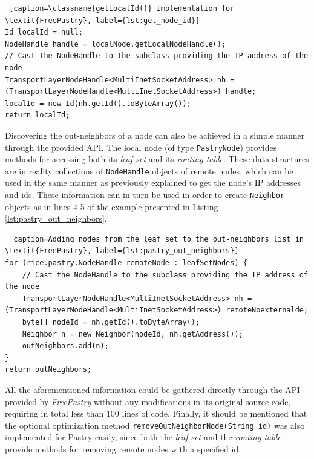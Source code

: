 \documentclass[a4paper,11pt,twoside]{report}
\newcommand{\classname}[1]{\texttt{#1}}
\begin{document}
\begin{description}
\lstset{
  numbers=left,
  stepnumber=1,    
  firstnumber=1,
  numberfirstline=true
}
\begin{lstlisting} [caption=\classname{getLocalId()} implementation for \textit{FreePastry}, label={lst:get_node_id}]
Id localId = null;
NodeHandle handle = localNode.getLocalNodeHandle();
// Cast the NodeHandle to the subclass providing the IP address of the node
TransportLayerNodeHandle<MultiInetSocketAddress> nh = (TransportLayerNodeHandle<MultiInetSocketAddress>) handle;
localId = new Id(nh.getId().toByteArray());
return localId;
\end{lstlisting}

Discovering the out-neighbors of a node can also be achieved in a simple manner through the provided API. The local node (of type \classname{PastryNode}) provides methods for accessing both its \textit{leaf set} and its \textit{routing table}. These data structures are in reality collections of \classname{NodeHandle} objects of remote nodes, which can be used in the same manner as previously explained to get the node's IP addresses and ids. These information can in turn be used in order to create \classname{Neighbor} objects as in lines 4-5 of the example presented in Listing \ref{lst:pastry_out_neighbors}.

\begin{lstlisting} [caption=Adding nodes from the leaf set to the out-neighbors list in \textit{FreePastry}, label={lst:pastry_out_neighbors}]
for (rice.pastry.NodeHandle remoteNode : leafSetNodes) {
	// Cast the NodeHandle to the subclass providing the IP address of the node
	TransportLayerNodeHandle<MultiInetSocketAddress> nh = (TransportLayerNodeHandle<MultiInetSocketAddress>) remoteNoexternalde;
	byte[] nodeId = nh.getId().toByteArray();
	Neighbor n = new Neighbor(nodeId, nh.getAddress());
	outNeighbors.add(n);
}
return outNeighbors;
\end{lstlisting}

All the aforementioned information could be gathered directly through the API provided by \textit{FreePastry} without any modifications in its original source code, requiring in total less than 100 lines of code. Finally, it should be mentioned that the optional optimization method \classname{removeOutNeighborNode(String id)} was also implemented for Pastry easily, since both the \textit{leaf set} and the \textit{routing table} provide methods for removing remote nodes with a specified id.

\item[Chord Implementation] \hfill \\


\end{description}
\end{document}
